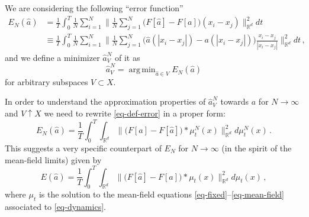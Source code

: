 \documentclass[A4paper,11pt]{article}
\theoremstyle{definition}
\newcommand{\R}{\mathbb{R}}
\DeclareMathOperator{\argmin}{arg\,min}
\begin{document}
We are considering the following ``error function''
\begin{equation}\label{eq-def-error}
	\begin{split}
	E_N(\widehat a)
		&=\frac{1}{T}\int_0^T\frac{1}{N}\sum_{i=1}^N\biggl\|\frac{1}{N}\sum_{j=1}^N
			\bigl(F[\widehat a]-F[a]\bigr)(x_i-x_j)\biggr\|_{\R^d}^2 dt\\
		&\equiv\frac{1}{T}\int_0^T\frac{1}{N}\sum_{i=1}^N\biggl\|\frac{1}{N}\sum_{j=1}^N
			\bigl(\widehat a(|x_i-x_j|)-a(|x_i-x_j|)\bigr)\frac{x_i-x_j}{|x_i-x_j|}\biggr\|_{\R^d}^2 dt\,,
	\end{split}
\end{equation}
and we define a minimizer $\widehat a^N_V$ of it as
\begin{equation*}
	\widehat a^N_V=\argmin_{\widehat a\in V}E_N(\widehat a)
\end{equation*}
for arbitrary subspaces $V \subset X$.

In order to understand the approximation properties of $\widehat a^N_V$ towards $a$ for $N\rightarrow\infty$ and $V \uparrow X$ we need to rewrite \eqref{eq-def-error} in a proper form:
\begin{equation}\label{eq-error-2}
	E_N(\widehat a)
		=\frac{1}{T}\int_0^T \int_{\R^d} \biggl\|\bigl(F[a]-F[\widehat a]\bigr)\ast\mu_t^N(x)\biggr\|^2_{\R^d} d\mu_t^N(x)\,.
\end{equation}
This suggests a very specific counterpart of $E_N$ for $N\rightarrow\infty$ (in the spirit of the mean-field limits) given by
\begin{equation}\label{eq-error-limit}
	E(\widehat a)=\frac{1}{T}\int_0^T \int_{\R^d} \biggl\|\bigl(F[\widehat a]-F[a]\bigr)\ast\mu_t(x)\biggr\|^2_{\R^d}d\mu_t(x)\,,
\end{equation}
where $\mu_t$ is the solution to the mean-field equations \eqref{eq-fixed}--\eqref{eq-mean-field} associated to \eqref{eq-dynamics}.
\end{document}
